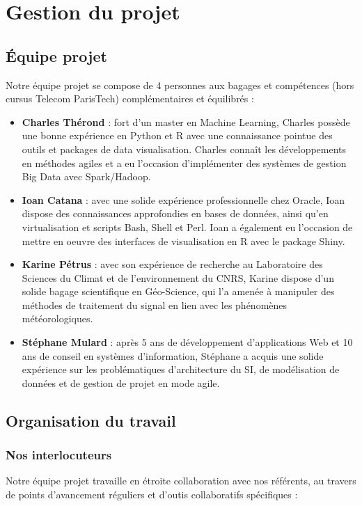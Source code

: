 \chapter{Gestion du projet}
\section{Équipe projet}
Notre équipe projet se compose de 4 personnes aux bagages et compétences (hors cursus Telecom ParisTech) complémentaires et équilibrés :
\begin{itemize}
\item \textbf{Charles Thérond} : fort d'un master en Machine Learning, Charles possède une bonne expérience en Python et R avec une connaissance pointue des outils et packages de data visualisation. Charles connaît les développements en méthodes agiles et a eu l'occasion d'implémenter des systèmes de gestion Big Data avec  Spark/Hadoop.
\item \textbf{Ioan Catana} : avec une solide expérience professionnelle chez Oracle, Ioan dispose des connaissances approfondies en bases de données, ainsi qu'en virtualisation et scripts Bash, Shell et Perl. Ioan a également eu l'occasion de mettre en oeuvre des interfaces de visualisation en R avec le package Shiny.
\item \textbf{Karine Pétrus} : avec son expérience de recherche au Laboratoire des Sciences du Climat et de l'environnement du CNRS, Karine dispose d'un solide bagage scientifique en Géo-Science, qui l'a amenée à manipuler des méthodes de traitement du signal en lien avec les phénomènes météorologiques.
\item \textbf{Stéphane Mulard} : après 5 ans de développement d'applications Web et 10 ans de conseil en systèmes d'information, Stéphane a acquis une solide expérience sur les problématiques d'architecture du SI, de modélisation de données et de gestion de projet en mode agile.
\end{itemize}

\section{Organisation du travail}
\subsection{Nos interlocuteurs}
Notre équipe projet travaille en étroite collaboration avec nos référents, au travers de points d'avancement réguliers et d'outis collaboratifs spécifiques :

